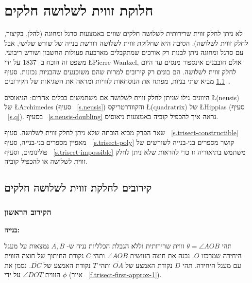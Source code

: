 

\chapter{חלוקת זווית לשלושה חלקים}
\label{c.trisect}

לא ניתן לחלק זווית שרירותית לשלושה חלקים שווים באמצעות סרגל ומחוגה (להלן, בקיצור, לחלק זווית לשלושה). הסיבה היא שחלוקת זווית לשלושה דורשת בנייה של שורש שלישי, אבל עם  סרגל ומחוגה ניתן לבנות רק אורכים שמתקבלים מארבעת פעולות החשבון ושורש ריבועי. משפט זה הוכח ב-%
$1837$
על ידי
\L{Pierre Wantzel},
אולם חובבנים אינספור מנסים עד היום לחלק זווית לשלושה. הם בונים רק קירובים למרות שהם משוכנעים שהבניות נכונות. סעיף%
~\ref{s.trisect-approx}
מביא שתי בניות, מפתח את הנוסחאות לזוויות ומראה את השגיאות של הקירובים.

היוונים גילו שניתן לחלק זווית לשלושה אם משתמשים בכלים אחרים: הניאוסיס 
\L{(neusis)}
של
\L{Archimedes}
(סעיף%
~\ref{s.neusis})
והקוודרטריקס
\L{(quadratrix)}
של
\L{Hippias}
(סעיף%
~\ref{s.q}).
בסעיף%
~\ref{s.neusis-doubling}
נראה איך להכפיל קוביה באמצעות ניאוסיס.

שאר הפרק מביא הוכחה שלא ניתן לחלק זווית לשלושה. סעיף%
~\ref{s.trisect-constructible}
מאפיין מספרים בני-בנייה, סעיף%
~\ref{s.trisect-poly}
קושר מספרים בני-בנייה לשורשים של פולינומים, וסעיף%
~\ref{s.trisect-impossible}
משתמש בתיאוריה זו כדי להראות שלא ניתן לחלק זווית לשלושה או להכפיל קוביה.



\section{קירובים לחלקת זווית לשלושה חלקים}\label{s.trisect-approx}

\subsection{הקירוב הראשון}\label{sub.trisect-approx1}

\noindent\textbf{בנייה:}

תהי 
$\theta=\angle AOB$
זווית שרירותית וללא הגבלת הכלליות נניח ש-%
$A,B$
נמצאות על מעגל היחידה שמרכזו 
$O$.
נבנה את חוצה הזוושית 
$\angle AOB$
ותהי 
$C$
נקודת החיתוך של חוצה הזווית עם מעגל היחידה. תהי
$D$
נקודת האמצע של
$\overline{OA}$
ותהי
$T$ 
נקודת האמצע של
$\overline{DC}$.
נסמן את הזווית
$\angle DOT$
על ידי
$\phi$
(איור%
~\ref{f.trisect-first-approx-1}).

